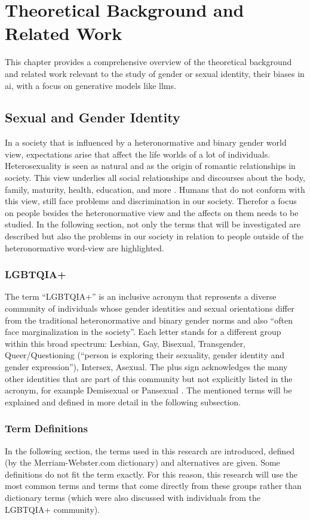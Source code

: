 \chapter{Theoretical Background and Related Work}

This chapter provides a comprehensive overview of the theoretical background and related work relevant to the study of gender or sexual identity, their biases in \acrfull{ai}, with a focus on generative models like \acrfull{llms}.


\section{Sexual and Gender Identity}
In a society that is influenced by a heteronormative and binary gender world view, expectations arise that affect the life worlds of a lot of individuals. Heterosexuality is seen as natural and as the origin of romantic relationships in society. This view underlies all social relationships and discourses about the body, family, maturity, health, education, and more \citep{heteronormativity}. Humans that do not conform with this view, still face problems and discrimination in our society.  Therefor a focus on people besides the heteronormative view and the affects on them needs to be studied. In the following section, not only the terms that will be investigated are described but also the problems in our society in relation to people outside of the heteronormative word-view are highlighted. 

\subsection{LGBTQIA+}
The term \enquote{LGBTQIA+} is an inclusive acronym that represents a diverse community of individuals whose gender identities and sexual orientations differ from the traditional heteronormative and binary gender norms and also \enquote{often face marginalization in the society}. Each letter stands for a different group within this broad spectrum: Lesbian, Gay, Bisexual, Transgender, Queer/Questioning (\enquote{person is exploring their sexuality, gender identity and gender expression}), Intersex, Asexual. The plus sign acknowledges the many other identities that are part of this community but not explicitly listed in the acronym, for example Demisexual or Pansexual \citep{lqbtqia}. The mentioned terms will be explained and defined in more detail in the following subsection. 

\subsection{Term Definitions}
\label{subsec:terms}
In the following section, the terms used in this research are introduced, defined (by the Merriam-Webster.com dictionary) and alternatives are given. Some definitions do not fit the term exactly. For this reason, this research will use the most common terms and terms that come directly from these groups rather than dictionary terms (which were also discussed with individuals from the LGBTQIA+ community).  

